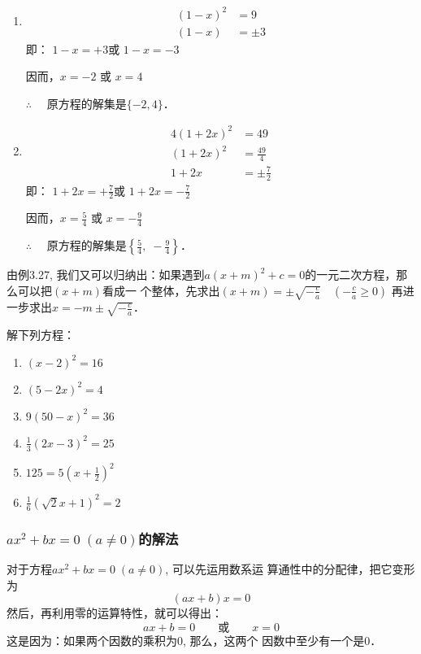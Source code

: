 \begin{solution}
\begin{enumerate}
    \item \begin{align*}
        (1-x)^2&=9\\
        (1-x)&=\pm 3 \tag{平方根的意义}
    \end{align*}
    即：    $1-x=+3$或    $1-x=-3$

    因而，$x=-2$ 或    $x=4$

 $\therefore\quad $   原方程的解集是$\{-2,4\}$．
    \item \begin{align*}
        4(1+2x)^2&=49\\
        (1+2x)^2&=\frac{49}{4}  \tag{两边除以4}\\
        1+2x&=\pm\frac{7}{2} \tag{平方根的意义}
    \end{align*}
    即：    $1+2x=+\frac{7}{2}$或    $1+2x=-\frac{7}{2}$

    因而，$x=\frac{5}{4}$ 或    $x=-\frac{9}{4}$   

    $\therefore\quad $   原方程的解集是$\left\{\frac{5}{4},\; -\frac{9}{4}\right\}$．

\end{enumerate} 
\end{solution}

由例3.27, 我们又可以归纳出：如果遇到$a(x+m)^2
+c=0$的一元二次方程，那么可以把$(x+m)$看成一
个整体，先求出$(x+m)=\pm\sqrt{-\frac{c}{a}}\quad \left(-\frac{c}{a}\ge 0\right)$
再进一步求出$x=-m\pm\sqrt{-\frac{c}{a}}$．

\begin{ex}
解下列方程：
\begin{multicols}{2}
    \begin{enumerate}
\item $(x-2)^{2}=16$
\item $(5-2 x)^{2}=4$
\item $9(50-x)^{2}=36$
\item $\frac{1}{3}(2 x-3)^{2}=25$
\item $125=5\left(x+\frac{1}{2}\right)^{2}$
\item $\frac{1}{6}(\sqrt{2} x+1)^{2}=2$
    \end{enumerate}
\end{multicols}
\end{ex}

\subsubsection{$ax^2+bx=0\; (a\ne 0)$的解法}
对于方程$ax^2+bx=0\; (a\ne 0)$, 可以先运用数系运
算通性中的分配律，把它变形为
\[(ax+b)x=0\]
然后，再利用零的运算特性，就可以得出：
\[ax+b=0\qquad  \text{或}\qquad x=0\]
这是因为：如果两个因数的乘积为0, 那么，这两个
因数中至少有一个是0．

